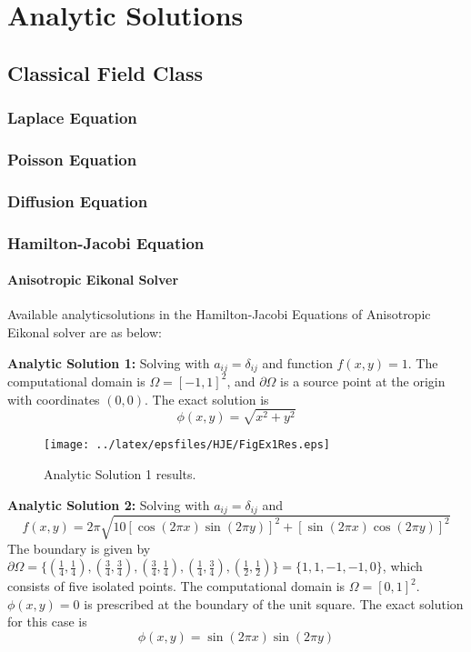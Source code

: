 \clearemptydoublepage
\chapter{Analytic Solutions}
\label{cha:analyticsolutions}

\section{Classical Field Class}

\subsection{Laplace Equation}

\subsection{Poisson Equation}

\subsection{Diffusion Equation}

\subsection{Hamilton-Jacobi Equation}

\subsubsection{Anisotropic Eikonal Solver}

Available analyticsolutions in the Hamilton-Jacobi Equations of Anisotropic Eikonal solver are as below:


\textbf{Analytic Solution 1:} Solving with $a_{ij}=\delta_{ij}$ and function $f(x,y)=1$. The computational domain is $\Omega=[-1,1]^2$, and $\partial\Omega$ is a source point at the origin with coordinates $(0,0)$. The exact solution is $$\phi(x,y)=\sqrt{x^2+y^2}$$

\begin{figure}[h]
  \centering
    \texttt{[image: ../latex/epsfiles/HJE/FigEx1Res.eps]}
  \caption{Analytic Solution 1 results.}
  \label{fig:Ex1}
\end{figure}


\textbf{Analytic Solution 2:} Solving with $a_{ij}=\delta_{ij}$ and $$f(x,y)=2\pi \sqrt{10[\cos{(2\pi x)}\sin{(2\pi y)}]^2+[\sin{(2\pi x)}\cos{(2\pi y)}]^2}$$ The boundary is given by $\partial\Omega=\{(\frac{1}{4},\frac{1}{4}),(\frac{3}{4},\frac{3}{4}),(\frac{3}{4},\frac{1}{4}),(\frac{1}{4},\frac{3}{4}),(\frac{1}{2},\frac{1}{2})\}=\{1,1,-1,-1,0\}$, which consists of five isolated points. The computational domain is $\Omega=[0,1]^2$. $\phi(x,y)=0$ is prescribed at the boundary of the unit square. The exact solution for this case is $$\phi(x,y)=\sin{(2\pi x)} \sin{(2\pi y)}$$

